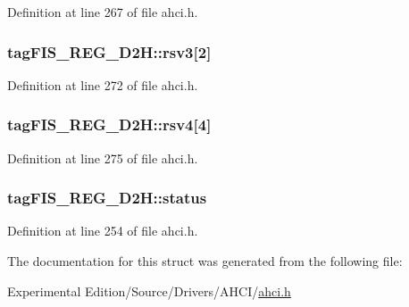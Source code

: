 Definition at line 267 of file ahci.\+h.

\subsubsection[{\texorpdfstring{rsv3}{rsv3}}]{ tag\+F\+I\+S\+\_\+\+R\+E\+G\+\_\+\+D2\+H\+::rsv3\mbox{[}2\mbox{]}}\hypertarget{structtagFIS__REG__D2H_a7214f42d9e1ccfc908886ceb8d766db2}{}\label{structtagFIS__REG__D2H_a7214f42d9e1ccfc908886ceb8d766db2}


Definition at line 272 of file ahci.\+h.

\subsubsection[{\texorpdfstring{rsv4}{rsv4}}]{ tag\+F\+I\+S\+\_\+\+R\+E\+G\+\_\+\+D2\+H\+::rsv4\mbox{[}4\mbox{]}}\hypertarget{structtagFIS__REG__D2H_a5695dd69336468b090aef20c7b58e98d}{}\label{structtagFIS__REG__D2H_a5695dd69336468b090aef20c7b58e98d}


Definition at line 275 of file ahci.\+h.

\subsubsection[{\texorpdfstring{status}{status}}]{ tag\+F\+I\+S\+\_\+\+R\+E\+G\+\_\+\+D2\+H\+::status}\hypertarget{structtagFIS__REG__D2H_a129444d0f3e7ded98c38e3630bbcc78d}{}\label{structtagFIS__REG__D2H_a129444d0f3e7ded98c38e3630bbcc78d}


Definition at line 254 of file ahci.\+h.



The documentation for this struct was generated from the following file\+:\begin{DoxyCompactItemize}
\item 
Experimental Edition/\+Source/\+Drivers/\+A\+H\+C\+I/\hyperlink{ahci_8h}{ahci.\+h}\end{DoxyCompactItemize}
